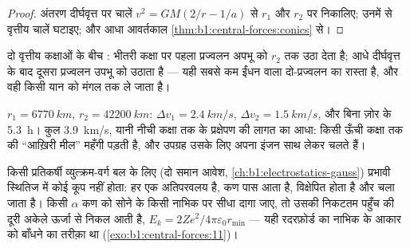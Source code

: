 \begin{proof}
अंतरण दीर्घवृत्त पर चालें $v^2 = GM(2/r - 1/a)$ से $r_1$ और
$r_2$ पर निकालिए; उनमें से वृत्तीय चालें घटाइए; और आधा आवर्तकाल
\cref{thm:b1:central-forces:conics} से।
\end{proof}

\begin{omfigure}

{\small दो वृत्तीय कक्षाओं के बीच : भीतरी कक्षा पर पहला
प्रज्वलन अपभू को $r_2$ तक उठा देता है; आधे दीर्घवृत्त के बाद दूसरा
प्रज्वलन उपभू को उठाता है --- यही सबसे कम ईंधन वाला दो-प्रज्वलन का रास्ता
है, और वही किसी यान को मंगल तक ले जाता है।}
\end{omfigure}

\begin{example}[नीची कक्षा से भूस्थिर तक]\label{ex:b1:central-forces:leogeo}
$r_1 = \qty{6770}{km}$, $r_2 = \qty{42200}{km}$: $\Delta v_1 = \qty{2.4}{km/s}$,
$\Delta v_2 = \qty{1.5}{km/s}$, और बिना ज़ोर के \qty{5.3}{h}। कुल
\qty{3.9}{km/s}, यानी नीची कक्षा तक के प्रक्षेपण की लागत का आधा: किसी ऊँची
कक्षा तक की ``आख़िरी मील'' महँगी पड़ती है, और उपग्रह उसके लिए अपना इंजन साथ
लेकर चलते हैं।
\end{example}

\begin{remark}[प्रतिकर्षी केंद्र]\label{rem:b1:central-forces:rutherford}
किसी प्रतिकर्षी व्युत्क्रम-वर्ग बल के लिए (दो समान आवेश,
\cref{ch:b1:electrostatics-gauss}) प्रभावी स्थितिज में कोई कूप नहीं होता:
हर  एक अतिपरवलय है, कण पास आता है, विक्षेपित होता है और चला जाता है।
किसी $\alpha$ कण को सोने के किसी नाभिक पर सीधा दागा जाए, तो उसकी निकटतम
पहुँच की दूरी अकेले ऊर्जा से निकल आती है, $E_k =
2Ze^2/4\pi\varepsilon_0 r_{\min}$ --- यही रदरफ़ोर्ड का नाभिक के आकार को बाँधने
का तरीक़ा था (\cref{exo:b1:central-forces:11})।
\end{remark}

